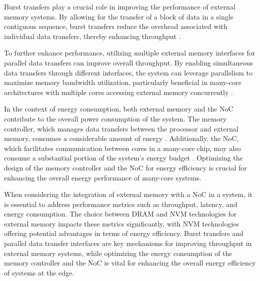 Burst transfers play a crucial role in improving the performance of external memory systems.
By allowing for the transfer of a block of data in a single contiguous sequence, burst transfers reduce the overhead associated with individual data transfers, thereby enhancing throughput \cite{bakhodaDesigningOnchipNetworks2013}.

To further enhance performance, utilizing multiple external memory interfaces for parallel data transfers can improve overall throughput.
By enabling simultaneous data transfers through different interfaces, the system can leverage parallelism to maximize memory bandwidth utilization, particularly beneficial in many-core architectures with multiple cores accessing external memory concurrently \cite{chenIncreasingOffchipBandwidth2014}.

In the context of energy consumption, both external memory and the NoC contribute to the overall power consumption of the system.
The memory controller, which manages data transfers between the processor and external memory, consumes a considerable amount of energy \cite{udipiRethinkingDRAMDesign2010}.
Additionally, the NoC, which facilitates communication between cores in a many-core chip, may also consume a substantial portion of the system's energy budget \cite{ziaHighlyscalable3DCLOS2010}.
Optimizing the design of the memory controller and the NoC for energy efficiency is crucial for enhancing the overall energy performance of many-core systems.

When considering the integration of external memory with a NoC in a system, it is essential to address performance metrics such as throughput, latency, and energy consumption.
The choice between DRAM and NVM technologies for external memory impacts these metrics significantly, with NVM technologies offering potential advantages in terms of energy efficiency.
Burst transfers and parallel data transfer interfaces are key mechanisms for improving throughput in external memory systems, while optimizing the energy consumption of the memory controller and the NoC is vital for enhancing the overall energy efficiency of systems at the edge.

